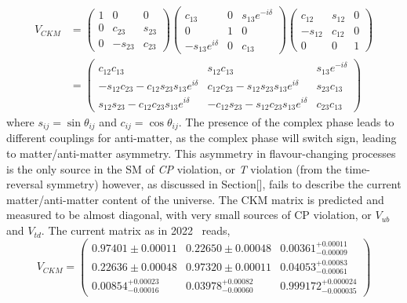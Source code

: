 \begin{equation}
\begin{split}
    V_{CKM} &= \begin{pmatrix} 1 & 0 & 0 \\ 0 & c_{23} & s_{23} \\ 0 & -s_{23} & c_{23} \end{pmatrix} \begin{pmatrix} c_{13} & 0 & s_{13}e^{-i\delta} \\ 0 & 1 & 0 \\ -s_{13}e^{i\delta} & 0 & c_{13} \end{pmatrix}
    \begin{pmatrix} c_{12} & s_{12} & 0 \\ -s_{12} & c_{12} & 0 \\ 0 & 0 & 1 \end{pmatrix} \\ 
    &= \begin{pmatrix} c_{12}c_{13} & s_{12}c_{13} & s_{13}e^{-i\delta} \\ -s_{12}c_{23}-c_{12}s_{23}s_{13}e^{i\delta} & c_{12}c_{23}-s_{12}s_{23}s_{13}e^{i\delta} & s_{23}c_{13} \\ s_{12}s_{23}-c_{12}c_{23}s_{13}e^{i\delta} & -c_{12}s_{23}-s_{12}c_{23}s_{13}e^{i\delta} & c_{23}c_{13} \end{pmatrix}
\end{split}
\end{equation}
where $s_{ij}=\sin\theta_{ij}$ and $c_{ij}=\cos\theta_{ij}$. The presence of the complex phase leads to different couplings for anti-matter, as the complex phase will switch sign, leading to matter/anti-matter asymmetry. This asymmetry in flavour-changing processes is the only source in the SM of \textit{CP} violation, or \textit{T} violation (from the time-reversal symmetry) however, as discussed in Section[], fails to describe the current matter/anti-matter content of the universe. The CKM matrix is predicted and measured to be almost diagonal, with very small sources of CP violation, or $V_{ub}$ and $V_{td}$. The current matrix as in 2022~\cite{pdg} reads, 
\begin{equation}
        V_{CKM}= \begin{pmatrix} 0.97401 \pm 0.00011 & 0.22650 \pm 0.00048 & 0.00361^{+0.00011}_{-0.00009} \\ 0.22636 \pm 0.00048 & 0.97320 \pm 0.00011 & 0.04053^{+0.00083}_{-0.00061} \\ 0.00854^{+0.00023}_{-0.00016} & 0.03978^{+0.00082}_{-0.00060} & 0.999172^{+0.000024}_{-0.000035} \end{pmatrix}
\end{equation}


